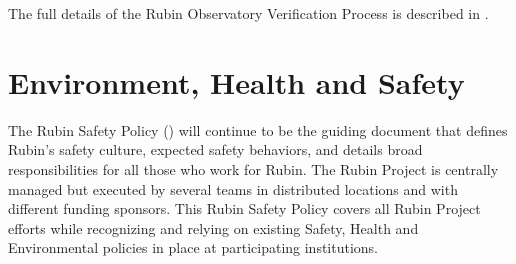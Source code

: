 \documentclass[SE,lsstdraft,authoryear,toc]{lsstdoc}
\begin{document}
The full details of the Rubin Observatory Verification Process is described in .

%

\section{Environment, Health and Safety}

The Rubin Safety Policy () will continue to be the guiding document that defines Rubin’s safety culture, expected safety behaviors, and details broad responsibilities for all those who work for Rubin.
The Rubin Project is centrally managed but executed by several teams in distributed locations and with different funding sponsors.
This Rubin Safety Policy covers all Rubin Project efforts while recognizing and relying on existing Safety,
Health and Environmental policies in place at participating institutions.
\end{document}
